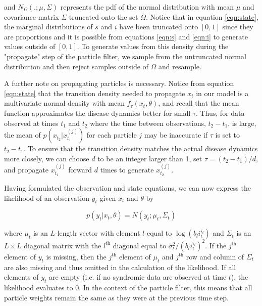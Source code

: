 \documentclass{elsarticle}
\begin{document}
\noindent and $N_{\Omega}(.;\mu,\Sigma)$ represents the pdf of the normal distribution with mean $\mu$ and covariance matrix $\Sigma$ truncated onto the set $\Omega$.  Notice that in equation \eqref{eqn:state}, the marginal distributions of $s$ and $i$ have been truncated onto $[0,1]$ since they are proportions and it is possible from equations \eqref{eqn:s} and \eqref{eqn:i} to generate values outside of $[0,1]$.  To generate values from this density during the "propagate" step of the particle filter, we sample from the untruncated normal distribution and then reject samples outside of $\Omega$ and resample.

A further note on propagating particles is necessary.  Notice from equation \eqref{eqn:state} that the transition density needed to propagate $x_t$ in our model is a multivariate normal density with mean $f_\tau(x_t,\theta)$, and recall that the mean function approximates the disease dynamics better for small $\tau$.  Thus, for data observed at times $t_1$ and $t_2$ where the time between observations, $t_2 - t_1$, is large, the mean of $p(x_{t_2}|x_{t_1}^{(j)})$ for each particle $j$ may be inaccurate if $\tau$ is set to $t_2 - t_1$.  To ensure that the transition density matches the actual disease dynamics more closely, we can choose $d$ to be an integer larger than 1, set $\tau = (t_2 - t_1) / d$, and propagate $x_{t_1}^{(j)}$ forward $d$ times to generate $x_{t_2}^{(j)}$.

Having formulated the observation and state equations, we can now express the likelihood of an observation $y_t$ given $x_t$ and $\theta$ by

\begin{equation}
p\left(y_t\left|x_t,\theta\right.\right) = N\left(y_t;\mu_t,\Sigma_t\right) \label{eqn:lik}
\end{equation}

\noindent where $\mu_t$ is an $L$-length vector with element $l$ equal to $\log(b_li_t^{\varsigma_l})$ and $\Sigma_t$ is an $L \times L$ diagonal matrix with the $l^{\mbox{th}}$ diagonal equal to $\sigma_l^2 / (b_li_t^{\varsigma_l})^2$.  If the $j^{\mbox{th}}$ element of $y_t$ is missing, then the $j^{\mbox{th}}$ element of $\mu_t$ and $j^{\mbox{th}}$ row and column of $\Sigma_t$ are also missing and thus omitted in the calculation of the likelihood.  If all elements of $y_t$ are empty (i.e. if no syndromic data are observed at time $t$), the likelihood evaluates to 0.  In the context of the particle filter, this means that all particle weights remain the same as they were at the previous time step.
\end{document}
